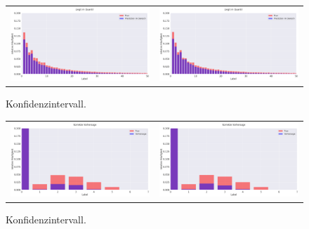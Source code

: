 \begin{figure}[h]
\centering
\begin{tabular}{cc}
\includegraphics[width=80mm]{abb/dist_LSTM.png}&
\includegraphics[width=80mm]{abb/dist_UNET.png}
\end{tabular}
\caption{Konfidenzintervall. \label{fig:quantiles}}
\end{figure}


\begin{figure}[h]
\centering
\begin{tabular}{cc}
\includegraphics[width=80mm]{abb/LSTM_LOGBIN.png}&
\includegraphics[width=80mm]{abb/UNET_LOGBIN.png}
\end{tabular}
\caption{Konfidenzintervall. \label{fig:quantiles}}
\end{figure}

\newpage
